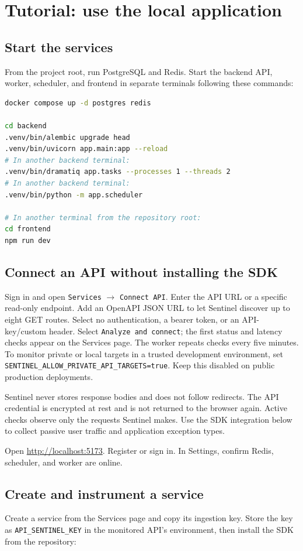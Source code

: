 \documentclass[11pt,a4paper]{article}
\begin{document}
\section{Tutorial: use the local application}

\subsection{Start the services}
From the project root, run PostgreSQL and Redis. Start the backend API, worker,
scheduler, and frontend in separate terminals following these commands:

\begin{lstlisting}[language=bash]
docker compose up -d postgres redis

cd backend
.venv/bin/alembic upgrade head
.venv/bin/uvicorn app.main:app --reload
# In another backend terminal:
.venv/bin/dramatiq app.tasks --processes 1 --threads 2
# In another backend terminal:
.venv/bin/python -m app.scheduler

# In another terminal from the repository root:
cd frontend
npm run dev
\end{lstlisting}

\subsection{Connect an API without installing the SDK}
Sign in and open \texttt{Services} $\rightarrow$ \texttt{Connect API}. Enter
the API URL or a specific read-only endpoint. Add an OpenAPI JSON URL to let
Sentinel discover up to eight GET routes. Select no authentication, a bearer
token, or an API-key/custom header. Select \texttt{Analyze and connect}; the
first status and latency checks appear on the Services page. The worker repeats
checks every five minutes. To monitor private or local targets in a trusted
development environment, set \texttt{SENTINEL\_ALLOW\_PRIVATE\_API\_TARGETS=true}.
Keep this disabled on public production deployments.

Sentinel never stores response bodies and does not follow redirects. The API
credential is encrypted at rest and is not returned to the browser again.
Active checks observe only the requests Sentinel makes. Use the SDK integration
below to collect passive user traffic and application exception types.

Open \url{http://localhost:5173}. Register or sign in. In Settings, confirm
Redis, scheduler, and worker are online.

\subsection{Create and instrument a service}
Create a service from the Services page and copy its ingestion key. Store the key
as \texttt{API\_SENTINEL\_KEY} in the monitored API's environment, then install
the SDK from the repository:
\end{document}

